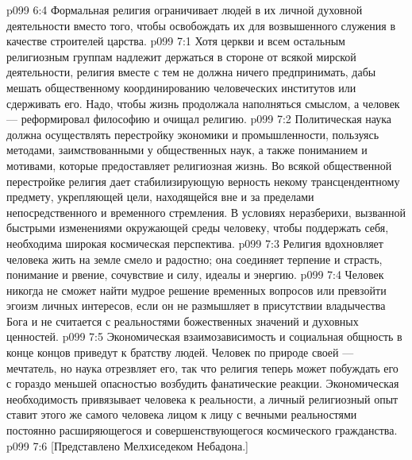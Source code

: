 \vs p099 6:4 Формальная религия ограничивает людей в их личной духовной деятельности вместо того, чтобы освобождать их для возвышенного служения в качестве строителей царства.
\vs p099 7:1 Хотя церкви и всем остальным религиозным группам надлежит держаться в стороне от всякой мирской деятельности, религия вместе с тем не должна ничего предпринимать, дабы мешать общественному координированию человеческих институтов или сдерживать его. Надо, чтобы жизнь продолжала наполняться смыслом, а человек --- реформировал философию и очищал религию.
\vs p099 7:2 Политическая наука должна осуществлять перестройку экономики и промышленности, пользуясь методами, заимствованными у общественных наук, а также пониманием и мотивами, которые предоставляет религиозная жизнь. Во всякой общественной перестройке религия дает стабилизирующую верность некому трансцендентному предмету, укрепляющей цели, находящейся вне и за пределами непосредственного и временного стремления. В условиях неразберихи, вызванной быстрыми изменениями окружающей среды человеку, чтобы поддержать себя, необходима широкая космическая перспектива.
\vs p099 7:3 Религия вдохновляет человека жить на земле смело и радостно; она соединяет терпение и страсть, понимание и рвение, сочувствие и силу, идеалы и энергию.
\vs p099 7:4 Человек никогда не сможет найти мудрое решение временных вопросов или превзойти эгоизм личных интересов, если он не размышляет в присутствии владычества Бога и не считается с реальностями божественных значений и духовных ценностей.
\vs p099 7:5 Экономическая взаимозависимость и социальная общность в конце концов приведут к братству людей. Человек по природе своей --- мечтатель, но наука отрезвляет его, так что религия теперь может побуждать его с гораздо меньшей опасностью возбудить фанатические реакции. Экономическая необходимость привязывает человека к реальности, а личный религиозный опыт ставит этого же самого человека лицом к лицу с вечными реальностями постоянно расширяющегося и совершенствующегося космического гражданства.
\vsetoff
\vs p099 7:6 [Представлено Мелхиседеком Небадона.]
